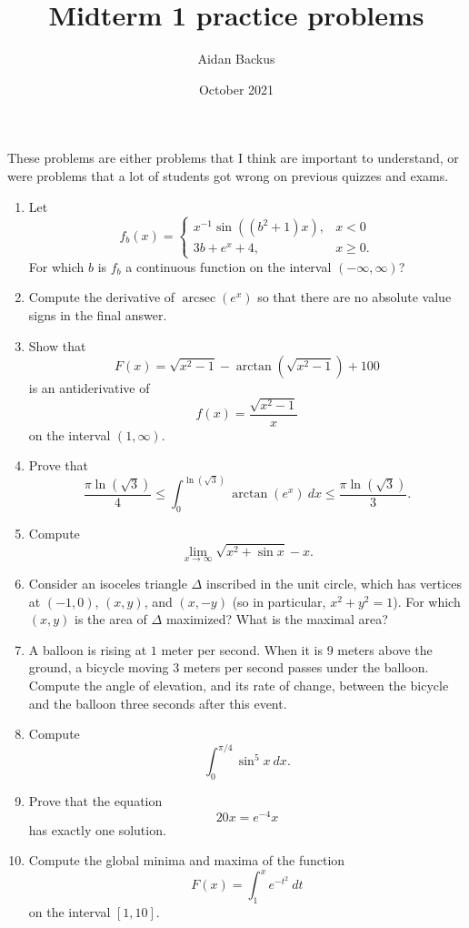 \documentclass[reqno,12pt,letterpaper]{amsart}
\title{Midterm 1 practice problems}
\author{Aidan Backus}
\date{October 2021}
\DeclareMathOperator{\arcsec}{arcsec}
\theoremstyle{definition}
\numberwithin{equation}{section}
\begin{document}




These problems are either problems that I think are important to understand, or were problems that a lot of students got wrong on previous quizzes and exams.

\begin{enumerate}
\item Let
$$f_b(x) = \begin{cases}
x^{-1} \sin((b^2 + 1)x), &x < 0\\
3b + e^x + 4, &x \geq 0.
\end{cases}$$
For which $b$ is $f_b$ a continuous function on the interval $(-\infty, \infty)$?
\item Compute the derivative of $\arcsec(e^x)$ so that there are no absolute value signs in the final answer.
\item Show that
$$F(x) = \sqrt{x^2 - 1} - \arctan(\sqrt{x^2 - 1}) + 100$$
is an antiderivative of
$$f(x) = \frac{\sqrt{x^2 - 1}}{x}$$
on the interval $(1, \infty)$.
\item Prove that
$$\frac{\pi \ln(\sqrt 3)}{4} \leq \int_0^{\ln(\sqrt 3)} \arctan(e^x) ~dx \leq \frac{\pi \ln(\sqrt 3)}{3}.$$
\item Compute
$$\lim_{x \to \infty} \sqrt{x^2 + \sin x} - x.$$
\item Consider an isoceles triangle $\Delta$ inscribed in the unit circle, which has vertices at $(-1, 0)$, $(x, y)$, and $(x, -y)$ (so in particular, $x^2 + y^2 = 1$). For which $(x, y)$ is the area of $\Delta$ maximized? What is the maximal area?
\item A balloon is rising at $1$ meter per second. When it is $9$ meters above the ground, a bicycle moving $3$ meters per second passes under the balloon. Compute the angle of elevation, and its rate of change, between the bicycle and the balloon three seconds after this event.
\item Compute
$$\int_0^{\pi/4} \sin^5 x ~dx.$$
\item Prove that the equation
$$20x = e^{-4}x$$
has exactly one solution.
\item Compute the global minima and maxima of the function
$$F(x) = \int_1^x e^{-t^2} ~dt$$
on the interval $[1, 10]$.
\end{enumerate}

\printbibliography
\end{document}
